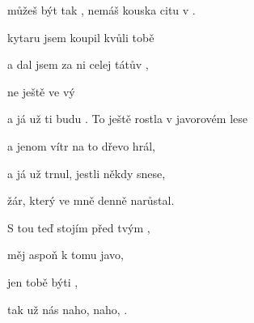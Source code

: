 

 můžeš být tak ,
 nemáš kouska citu v .
         

\zs
{} kytaru jsem koupil
kvůli tobě

a dal jsem za ni
celej tátův ,

ne ještě  ve vý 

a já už 
 ti budu .
\ks
\zs
To ještě rostla v javorovém lese

a jenom vítr na to dřevo hrál,

a já už trnul, jestli někdy snese,

žár, který ve mně denně narůstal.
\ks

\zs
S tou  teď stojím před tvým ,

měj  aspoň k tomu javo,

jen  tobě  býti , 

{tak} už nás   naho,
 naho,  .
\ks
\kp


